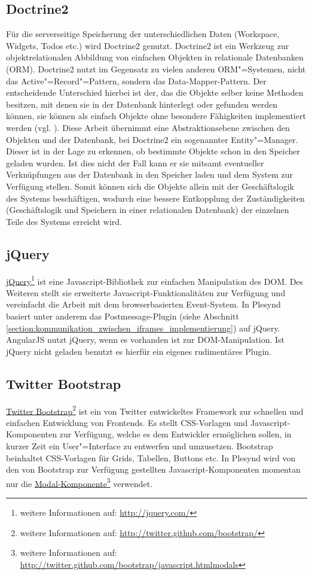\subsection{Doctrine2}\label{section:doctrine2}
Für die serverseitige Speicherung der unterschiedlichen Daten (Workspace, Widgets, Todos etc.) wird Doctrine2 genutzt. Doctrine2 ist ein Werkzeug zur objektrelationalen Abbildung von einfachen Objekten in relationale Datenbanken (\ac{ORM}). Doctrine2 nutzt im Gegensatz zu vielen anderen \ac{ORM}"=Systemen, nicht das Active"=Record"=Pattern, sondern das Data-Mapper-Pattern. Der entscheidende Unterschied hierbei ist der, das die Objekte selber keine Methoden besitzen, mit denen sie in der Datenbank hinterlegt oder gefunden werden können, sie können als einfach Objekte ohne besondere Fähigkeiten implementiert werden (vgl. \cite{Fowler2002}). Diese Arbeit übernimmt eine Abstraktionsebene zwischen den Objekten und der Datenbank, bei Doctrine2 ein sogenannter Entity"=Manager. Dieser ist in der Lage zu erkennen, ob bestimmte Objekte schon in den Speicher geladen wurden. Ist dies nicht der Fall kann er sie mitsamt eventueller Verknüpfungen aus der Datenbank in den Speicher laden und dem System zur Verfügung stellen. Somit können sich die Objekte allein mit der Geschäftslogik des Systems beschäftigen, wodurch eine bessere Entkopplung der Zuständigkeiten (Geschäftslogik und Speichern in einer relationalen Datenbank) der einzelnen Teile des Systems erreicht wird.

\subsection{jQuery}
\href{http://jquery.com/}{jQuery}\footnote{weitere Informationen auf: \url{http://jquery.com/}} ist eine Javascript-Bibliothek zur einfachen Manipulation des \ac{DOM}. Des Weiteren stellt sie erweiterte Javascript-Funktionalitäten zur Verfügung und vereinfacht die Arbeit mit dem browserbasierten Event-System. In Plesynd basiert unter anderem das Postmessage-Plugin (siehe Abschnitt \ref{section:kommunikation_zwischen_iframes_implementierung}) auf jQuery. AngularJS nutzt jQuery, wenn es vorhanden ist zur \ac{DOM}-Manipulation. Ist jQuery nicht geladen benutzt es hierfür ein eigenes rudimentäres Plugin.

\subsection{Twitter Bootstrap}
\href{http://twitter.github.com/bootstrap/}{Twitter Bootstrap}\footnote{weitere Informationen auf: \url{http://twitter.github.com/bootstrap/}} ist ein von Twitter entwickeltes Framework zur schnellen und einfachen Entwicklung von Frontends. Es stellt \ac{CSS}-Vorlagen und Javascript-Komponenten zur Verfügung, welche es dem Entwickler ermöglichen sollen, in kurzer Zeit ein User"=Interface zu entwerfen und umzusetzen. Bootstrap beinhaltet \ac{CSS}-Vorlagen für Grids, Tabellen, Buttons etc. In Plesynd wird von den von Bootstrap zur Verfügung gestellten Javascript-Komponenten momentan nur die \href{http://twitter.github.com/bootstrap/javascript.htmlmodals}{Modal-Komponente}\footnote{weitere Informationen auf: \url{http://twitter.github.com/bootstrap/javascript.htmlmodals}} verwendet. 

